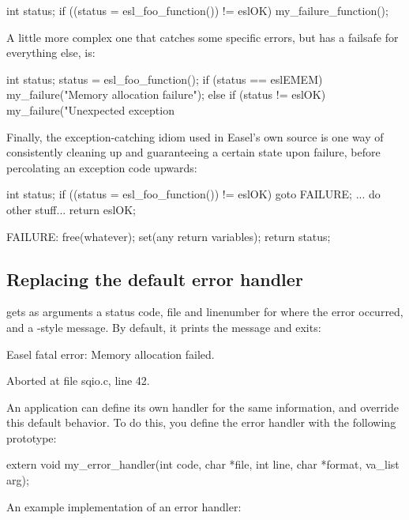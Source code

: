 \begin{cchunk}
     int status;
     if ((status = esl_foo_function()) != eslOK)  my_failure_function();
\end{cchunk}

A little more complex one that catches some specific errors, but has a
failsafe for everything else, is:

\begin{cchunk}
     int status;
     status = esl_foo_function();
     if      (status == eslEMEM) my_failure("Memory allocation failure");
     else if (status != eslOK)   my_failure("Unexpected exception %
\end{cchunk}

Finally, the exception-catching idiom used in Easel's own source is
one way of consistently cleaning up and guaranteeing a certain state
upon failure, before percolating an exception code upwards:

\begin{cchunk}
     int status;
     if ((status = esl_foo_function()) != eslOK)  goto FAILURE;
     ... do other stuff...
     return eslOK;

  FAILURE:
     free(whatever);
     set(any return variables);
     return status;
\end{cchunk}


\subsection{Replacing the default error handler}

 gets as arguments a status code, file and
linenumber for where the error occurred, and a -style
message. By default, it prints the message and exits:

\begin{cchunk}
Easel fatal error:
Memory allocation failed.

Aborted at file sqio.c, line 42. 
\end{cchunk}

An application can define its own handler for the same information,
and override this default behavior. To do this, you define the error
handler with the following prototype:

\begin{cchunk}
extern void my_error_handler(int code, char *file, int line, char *format, va_list arg);
\end{cchunk}

An example implementation of an error handler:

